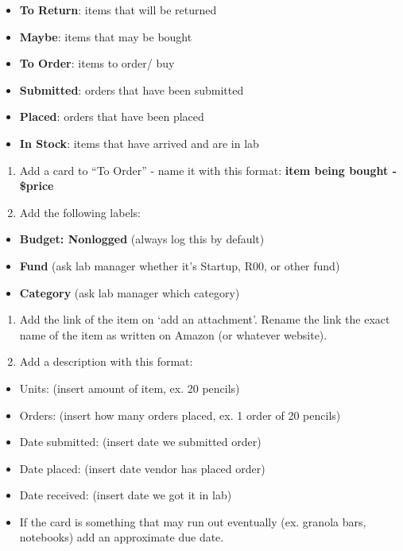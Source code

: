 \documentclass[]{book}
\providecommand{\tightlist}{%
  \setlength{\itemsep}{0pt}\setlength{\parskip}{0pt}}
\begin{document}
\begin{itemize}
\tightlist
\item
  \textbf{To Return}: items that will be returned
\item
  \textbf{Maybe}: items that may be bought
\item
  \textbf{To Order}: items to order/ buy
\item
  \textbf{Submitted}: orders that have been submitted
\item
  \textbf{Placed}: orders that have been placed
\item
  \textbf{In Stock}: items that have arrived and are in lab
\end{itemize}

\begin{enumerate}
\def\labelenumi{\arabic{enumi}.}
\setcounter{enumi}{1}
\item
  Add a card to ``To Order'' - name it with this format: \textbf{item being bought - \$price}
\item
  Add the following labels:
\end{enumerate}

\begin{itemize}
\tightlist
\item
  \textbf{Budget: Nonlogged} (always log this by default)
\item
  \textbf{Fund} (ask lab manager whether it's Startup, R00, or other fund)
\item
  \textbf{Category} (ask lab manager which category)
\end{itemize}

\begin{enumerate}
\def\labelenumi{\arabic{enumi}.}
\setcounter{enumi}{3}
\item
  Add the link of the item on `add an attachment'. Rename the link the exact name of the item as written on Amazon (or whatever website).
\item
  Add a description with this format:
\end{enumerate}

\begin{itemize}
\tightlist
\item
  Units: (insert amount of item, ex. 20 pencils)
\item
  Orders: (insert how many orders placed, ex. 1 order of 20 pencils)
\item
  Date submitted: (insert date we submitted order)
\item
  Date placed: (insert date vendor has placed order)
\item
  Date received: (insert date we got it in lab)
\item
  If the card is something that may run out eventually (ex. granola bars, notebooks) add an approximate due date.
\end{itemize}
\end{document}

